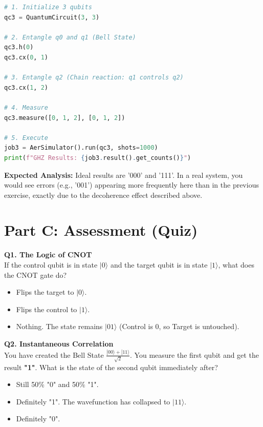 \documentclass[a4paper,11pt]{article}
\begin{document}
\begin{tcolorbox}[colback=green!5!white,colframe=green!75!black,title=Coding Task: The 3-Qubit Entangler]
\begin{lstlisting}[language=Python]
# 1. Initialize 3 qubits
qc3 = QuantumCircuit(3, 3)

# 2. Entangle q0 and q1 (Bell State)
qc3.h(0)
qc3.cx(0, 1)

# 3. Entangle q2 (Chain reaction: q1 controls q2)
qc3.cx(1, 2)

# 4. Measure
qc3.measure([0, 1, 2], [0, 1, 2])

# 5. Execute
job3 = AerSimulator().run(qc3, shots=1000)
print(f"GHZ Results: {job3.result().get_counts()}")
\end{lstlisting}
\textbf{Expected Analysis:} Ideal results are '000' and '111'. In a real system, you would see errors (e.g., '001') appearing more frequently here than in the previous exercise, exactly due to the decoherence effect described above.
\end{tcolorbox}

\section{Part C: Assessment (Quiz)}

\textbf{Q1. The Logic of CNOT}\\
If the control qubit is in state $|0\rangle$ and the target qubit is in state $|1\rangle$, what does the CNOT gate do?
\begin{itemize}
    \item[A)] Flips the target to $|0\rangle$.
    \item[B)] Flips the control to $|1\rangle$.
    \item[C)] Nothing. The state remains $|01\rangle$ (Control is 0, so Target is untouched).
\end{itemize}

\vspace{0.3cm}

\textbf{Q2. Instantaneous Correlation}\\
You have created the Bell State $\frac{|00\rangle + |11\rangle}{\sqrt{2}}$. You measure the first qubit and get the result \textbf{"1"}. What is the state of the second qubit immediately after?
\begin{itemize}
    \item[A)] Still 50\% "0" and 50\% "1".
    \item[B)] Definitely "1". The wavefunction has collapsed to $|11\rangle$.
    \item[C)] Definitely "0".
\end{itemize}
\end{document}
